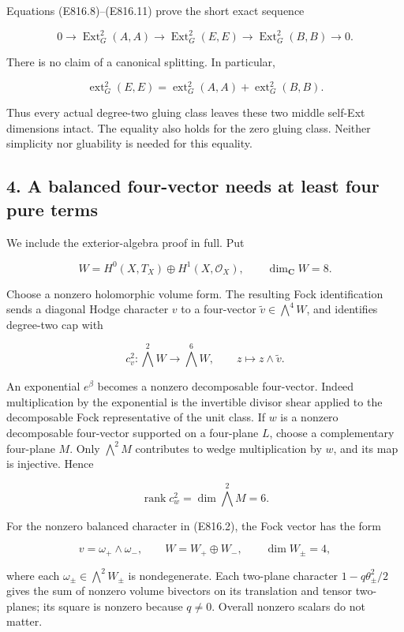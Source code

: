 Equations (E816.8)--(E816.11) prove the short exact sequence

\[
 0\longrightarrow\operatorname{Ext}^2_G(A,A)
  \longrightarrow\operatorname{Ext}^2_G(E,E)
  \longrightarrow\operatorname{Ext}^2_G(B,B)
  \longrightarrow0.
 \tag{E816.12}
\]

There is no claim of a canonical splitting. In particular,

\[
 \operatorname{ext}^2_G(E,E)
   =\operatorname{ext}^2_G(A,A)
     +\operatorname{ext}^2_G(B,B).
 \tag{E816.13}
\]

Thus every actual degree-two gluing class leaves these two middle
self-Ext dimensions intact. The equality also holds for the zero gluing
class. Neither simplicity nor gluability is needed for this equality.

\subsection{4. A balanced four-vector needs at least four pure
terms}\label{SF-E816-a-balanced-four-vector-needs-at-least-four-pure-terms}

We include the exterior-algebra proof in full. Put

\[
 W=H^0(X,T_X)\oplus H^1(X,\mathcal O_X),
 \qquad\dim_{\mathbf C}W=8.
\]

Choose a nonzero holomorphic volume form. The resulting Fock
identification sends a diagonal Hodge character \(v\) to a four-vector
\(\widetilde v\in\bigwedge^4W\), and identifies degree-two cap with

\[
 c_v^2:\bigwedge^2W\longrightarrow\bigwedge^6W,
 \qquad z\longmapsto z\wedge\widetilde v.
 \tag{E816.14}
\]

An exponential \(e^\beta\) becomes a nonzero decomposable four-vector.
Indeed multiplication by the exponential is the invertible divisor shear
applied to the decomposable Fock representative of the unit class. If
\(w\) is a nonzero decomposable four-vector supported on a four-plane
\(L\), choose a complementary four-plane \(M\). Only \(\bigwedge^2M\)
contributes to wedge multiplication by \(w\), and its map is injective.
Hence

\[
 \operatorname{rank}c_w^2=\dim\bigwedge^2M=6.
 \tag{E816.15}
\]

For the nonzero balanced character in (E816.2), the Fock vector has the
form

\[
 v=\omega_+\wedge\omega_-,
 \qquad W=W_+\oplus W_-,\qquad\dim W_\pm=4,
 \tag{E816.16}
\]

where each \(\omega_\pm\in\bigwedge^2W_\pm\) is nondegenerate. Each
two-plane character \(1-q\theta_\pm^2/2\) gives the sum of nonzero
volume bivectors on its translation and tensor two-planes; its square is
nonzero because \(q\ne0\). Overall nonzero scalars do not matter.

